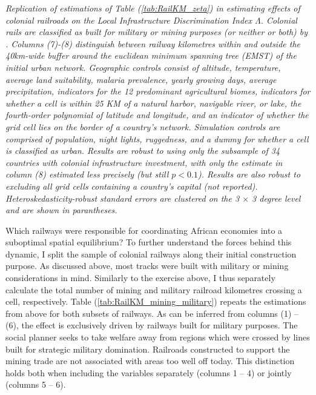 \documentclass[11pt, oneside]{article}   	%
\let\oldref\ref
\renewcommand{\ref}[1]{(\oldref{#1})}
\newcommand{\mysubcaption}[1]{
\justify
\begin{spacing}{0.7}
\textit{\footnotesize #1}
\end{spacing}}
\begin{document}
\begin{table}[t]
{}

\mysubcaption{Replication of estimations of Table \ref{tab:RailKM_zeta} in estimating effects of colonial railroads on the Local Infrastructure Discrimination Index $\Lambda$. Colonial rails are classified as built for military or mining purposes (or neither or both) by \cite{jedwab_permanent_2016}. Columns (7)-(8) distinguish between railway kilometres within and outside the 40km-wide buffer around the euclidean minimum spanning tree (EMST) of the initial urban network. Geographic controls consist of altitude, temperature, average land suitability, malaria prevalence, yearly growing days, average precipitation, indicators for the 12 predominant agricultural biomes, indicators for whether a cell is within 25 KM of a natural harbor, navigable river, or lake, the fourth-order polynomial of latitude and longitude, and an indicator of whether the grid cell lies on the border of a country's network. Simulation controls are comprised of population, night lights, ruggedness, and a dummy for whether a cell is classified as urban. Results are robust to using only the subsample of 34 countries with colonial infrastructure investment, with only the estimate in column (8) estimated less precisely (but still $p<0.1$). Results are also robust to excluding all grid cells containing a country's capital (not reported). Heteroskedasticity-robust standard errors are clustered on the 3 $\times$ 3 degree level and are shown in parantheses.}
\end{table}

Which railways were responsible for coordinating African economies into a suboptimal spatial equilibrium? To further understand the forces behind this dynamic, I split the sample of colonial railways along their initial construction purpose. As discussed above, most tracks were built with military or mining considerations in mind. Similarly to the exercise above, I thus separately calculate the total number of mining and military railroad kilometres crossing a cell, respectively. Table \ref{tab:RailKM_mining_military} repeats the estimations from above for both subsets of railways. As can be inferred from columns (1) -- (6), the effect is exclusively driven by railways built for military purposes. The social planner seeks to take welfare away from regions which were crossed by lines built for strategic military domination. Railroads constructed to support the mining trade are not associated with areas too well off today. This distinction holds both when including the variables separately (columns 1 -- 4) or jointly (columns 5 -- 6).
\end{document}

